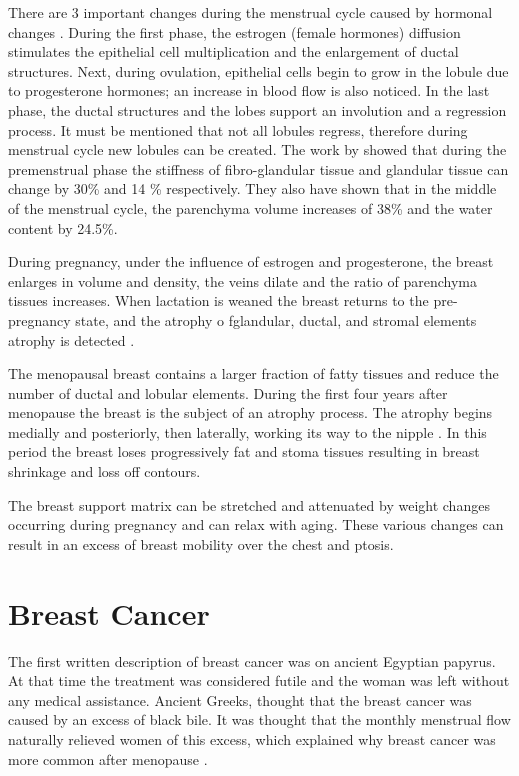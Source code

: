 There are 3 important changes during the menstrual cycle caused by hormonal changes \citep{andolina2011mammographic}. During the first phase, the estrogen (female hormones) diffusion stimulates the epithelial cell multiplication and the enlargement of ductal structures. Next, during ovulation, epithelial cells begin to grow in the lobule due to progesterone hormones; an increase in blood flow is also noticed. In the last phase, the ductal structures and the lobes support an involution and a regression process. It must be mentioned that not all lobules regress, therefore during menstrual cycle new lobules can be created.   The work by \cite{lorenzen_menstrual-cycle_2003} showed that during the premenstrual phase the stiffness of fibro-glandular tissue and glandular tissue can change by 30\% and 14 \% respectively. They also have shown that in the middle of the menstrual cycle, the parenchyma volume increases of 38\% and the water content by 24.5\%.

During pregnancy, under the influence of estrogen and progesterone, the breast enlarges in volume and density, the veins dilate and the ratio of parenchyma tissues increases.  When lactation is weaned the breast returns to the pre-pregnancy state, and the atrophy o fglandular, ductal, and stromal elements atrophy is detected \citep{pandya_breast_2011}.

The menopausal breast contains a larger fraction of fatty tissues and reduce the number of ductal and lobular elements. During the first four years after menopause the breast is the subject of an atrophy process. The atrophy begins medially and posteriorly, then laterally, working its way to the nipple \citep{andolina2011mammographic}. In this period the breast loses progressively fat and stoma tissues resulting in breast shrinkage and loss off contours.

 The breast support matrix can be stretched and attenuated by weight changes occurring during pregnancy and can relax with aging. These various changes can result in an excess of breast mobility over the chest and ptosis. 

\section{Breast Cancer}\label{section:breastcancer}

The first written description of breast cancer was on ancient Egyptian papyrus. At that time the treatment was considered futile and the woman was left without any medical assistance. Ancient Greeks, thought that the breast cancer was caused by an excess of black bile. It was thought that the monthly menstrual flow naturally relieved women of this excess, which explained why breast cancer was more common after menopause \citep{andolina2011mammographic}.

